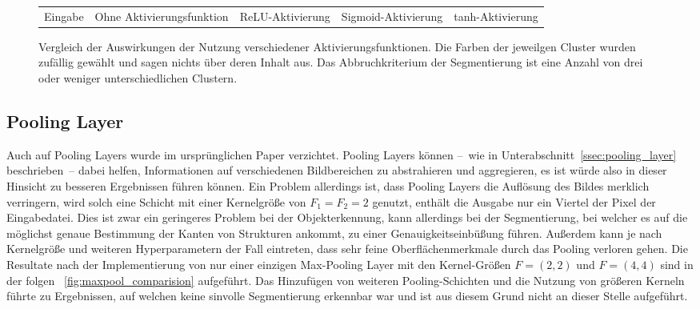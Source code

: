 \begin{figure}[h!]
\begin{tabular}{C{0.19\textwidth}C{0.19\textwidth}C{0.19\textwidth}C{0.19\textwidth}C{0.19\textwidth}}
		\hspace{2pt}\newline\centering Eingabe & 
		\hspace{2pt}\newline\centering Ohne Aktivierungsfunktion &
		\hspace{2pt}\newline\centering ReLU-Aktivierung &
		\hspace{2pt}\newline\centering Sigmoid-Aktivierung &
		\hspace{2pt}\newline\centering tanh-Aktivierung 
	\end{tabular}
	\caption{Vergleich der Auswirkungen der Nutzung verschiedener Aktivierungsfunktionen. Die Farben der jeweilgen Cluster wurden zufällig gewählt und sagen nichts über deren Inhalt aus. Das Abbruchkriterium der Segmentierung ist eine Anzahl von drei oder weniger unterschiedlichen Clustern.}
	\label{fig:activation_comparision}
\end{figure}

\subsection{Pooling Layer}
\label{ssec:network_architecture_pooling}

Auch auf Pooling Layers wurde im ursprünglichen Paper verzichtet. Pooling Layers können --~wie in Unterabschnitt~\ref{ssec:pooling_layer} beschrieben~-- dabei helfen, Informationen auf verschiedenen Bildbereichen zu abstrahieren und aggregieren, es ist würde also in dieser Hinsicht zu besseren Ergebnissen führen können. Ein Problem allerdings ist, dass Pooling Layers die Auflösung des Bildes merklich verringern, wird solch eine Schicht \bspw mit einer Kernelgröße von $F_1=F_2=2$ genutzt, enthält die Ausgabe nur ein Viertel der Pixel der Eingabedatei. Dies ist zwar ein geringeres Problem bei der Objekterkennung, kann allerdings bei der Segmentierung, bei welcher es auf die möglichst genaue Bestimmung der Kanten von Strukturen ankommt, zu einer Genauigkeitseinbüßung führen. Außerdem kann je nach Kernelgröße und weiteren Hyperparametern der Fall eintreten, dass sehr feine Oberflächenmerkmale durch das Pooling verloren gehen. Die Resultate nach der Implementierung von nur einer einzigen Max-Pooling Layer mit den Kernel-Größen $F=(2, 2)$ und $F=(4, 4)$ sind in der folgen \figurename~\ref{fig:maxpool_comparision} aufgeführt. Das Hinzufügen von weiteren Pooling-Schichten und die Nutzung von größeren Kerneln führte zu Ergebnissen, auf welchen keine sinvolle Segmentierung erkennbar war und ist aus diesem Grund nicht an dieser Stelle aufgeführt.

